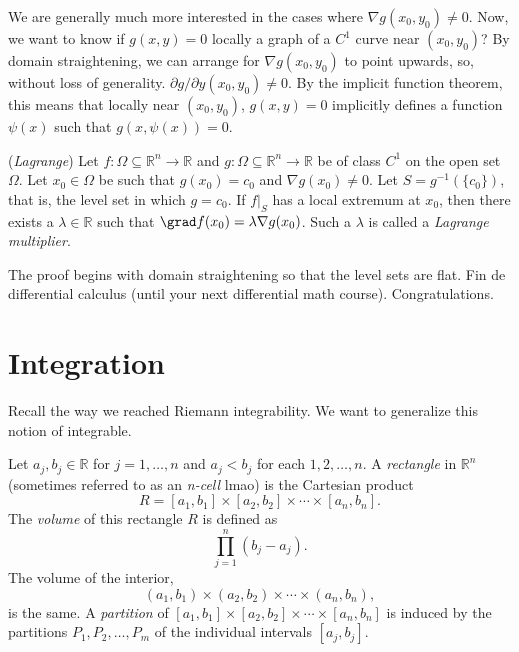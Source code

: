 \documentclass[11pt]{article}
\theoremstyle{definition}
\newcommand{\R}{\mathbb{R}}                      %
\newcommand{\dell}{\partial}
\begin{document}
We are generally much more interested in the cases where $\nabla g(x_0,y_0)\neq 0$. Now, we want to know if $g(x,y)=0$ locally a graph of a $C^1$ curve near $(x_0,y_0)$? By domain straightening, we can arrange for $\nabla g(x_0,y_0)$ to point upwards, so, without loss of generality. $\dell g/ \dell y (x_0,y_0)\neq 0$. By the implicit function theorem, this means that locally near $(x_0,y_0)$, $g(x,y)=0$ implicitly defines a function $\psi(x)$ such that $g(x,\psi(x))=0$.

\begin{shaded}
    \theorem (\textit{Lagrange}) Let $f:\Omega \subseteq \R^n\to \R$ and $g:\Omega \subseteq \R^n\to \R$ be of class $C^1$ on the open set $\Omega$. Let $x_0\in \Omega$ be such that $g(x_0)=c_0$ and $\nabla g(x_0)\neq 0$. Let $S=g^{-1}(\{c_0\})$, that is, the level set in which $g=c_0$. If $f|_S$ has a local extremum at $x_0$, then there exists a $\lambda\in\R$ such that $\grad f(x_0)=\lambda \nabla g(x_0)$. Such a $\lambda$ is called a \textit{Lagrange multiplier}.
\end{shaded}

The proof begins with domain straightening so that the level sets are flat. Fin de differential calculus (until your next differential math course). Congratulations.

\section{Integration}

Recall the way we reached Riemann integrability. We want to generalize this notion of integrable.

\begin{mdframed}[backgroundcolor = blue!10]
\vspace{+0.1cm}

 Let $a_j,b_j\in \R$ for $j=1,\dots,n$ and $a_j<b_j$ for each $1,2,\dots, n$. A \textit{rectangle} in $\R^n$ (sometimes referred to as an \textit{n-cell} lmao) is the Cartesian product
$$
R=[a_1,b_1]\times [a_2,b_2]\times\cdots\times [a_n,b_n].
$$
The \textit{volume} of this rectangle $R$ is defined as
$$
\prod_{j=1}^n (b_j-a_j).
$$
The volume of the interior, 
$$
(a_1,b_1)\times (a_2,b_2)\times\cdots\times (a_n,b_n),
$$
is the same. A \textit{partition} of $[a_1,b_1]\times [a_2,b_2]\times\cdots\times [a_n,b_n]$ is induced by the partitions $P_1,P_2,\dots, P_m$ of the individual intervals $[a_j,b_j]$.
\end{mdframed}
\end{document}
